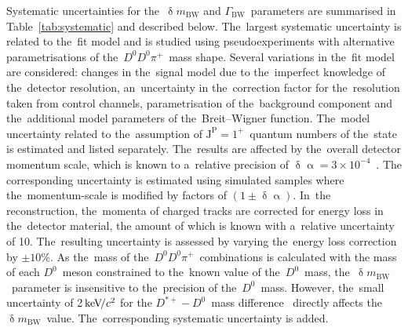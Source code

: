 \documentclass[12pt,a4paper]{article}
\def\Ppi         {\ensuremath{\uppi}\xspace}
\def\PD      {\ensuremath{\mathrm{D}}\xspace}
\def\Ppi         {\ensuremath{\pi}\xspace}
\def\PD      {\ensuremath{D}\xspace}
\def\pion   {{\ensuremath{\Ppi}}\xspace}
\def\pip    {{\ensuremath{\pion^+}}\xspace}
\def\D       {{\ensuremath{\PD}}\xspace}
\def\Dz      {{\ensuremath{\D^0}}\xspace}
\def\Dstarp  {{\ensuremath{\D^{*+}}}\xspace}
\newcommand{\aunit}[1]{\ensuremath{\text{\,#1}}}
\newcommand{\kevcc}{\ensuremath{\aunit{ke\kern -0.1em V\!/}c^2}\xspace}
\begin{document}
Systematic uncertainties 
for the~$\updelta m_{\mathrm{BW}}$
and 
$\Gamma_{\mathrm{BW}}$~parameters 
are summarised in Table~\ref{tab:systematic}
and described below. The~largest systematic uncertainty 
is related to the~fit model 
and is studied using pseudoexperiments 
with alternative parametrisations 
of the~\Dz\Dz\pip~mass shape.
Several
variations in 
the~fit model are considered: 
changes in the~signal model due 
to the~imperfect knowledge of the~detector resolution, 
an~uncertainty in 
the~correction factor for 
the~resolution 
taken from control channels,
parametrisation of the~background component
and the~additional model parameters 
of the~Breit\nobreakdash--Wigner function.
The~model uncertainty related to 
the~assumption of $\mathrm{J^P}=1^+$~quantum 
numbers of the~state 
is estimated and listed separately.
The~results are affected 
by the~overall detector momentum scale, 
which is known to 
a~relative precision of 
$\updelta\upalpha=
3\times10^{-4}$~\cite{LHCb-PAPER-2013-011}. 
The corresponding uncertainty is 
estimated using simulated samples where 
the~momentum-scale is modified by 
factors of $\left(1\pm\updelta\upalpha\right)$.
In~the reconstruction, 
the~momenta of charged tracks 
are corrected for energy loss 
in the~detector material,  
the amount of which is known 
with a~relative uncertainty
of 10. The~resulting uncertainty 
is assessed by varying 
the~energy loss correction 
by $\pm10\%$.
As the~mass of the~$\Dz\Dz\pip$~combinations is 
calculated with the mass of each $\Dz$~meson 
constrained to the~known value of the~\Dz~mass,
the~$\updelta m_{\mathrm{BW}}$~parameter
is insensitive to the~precision of the~\Dz~mass.
However, the~small uncertainty of 2\kevcc for
the $\Dstarp-\Dz$~mass difference~\cite{PDG2021}
directly affects 
the~$\updelta m_{\mathrm{BW}}$~value.
The~corresponding systematic uncertainty is added.
\end{document}
